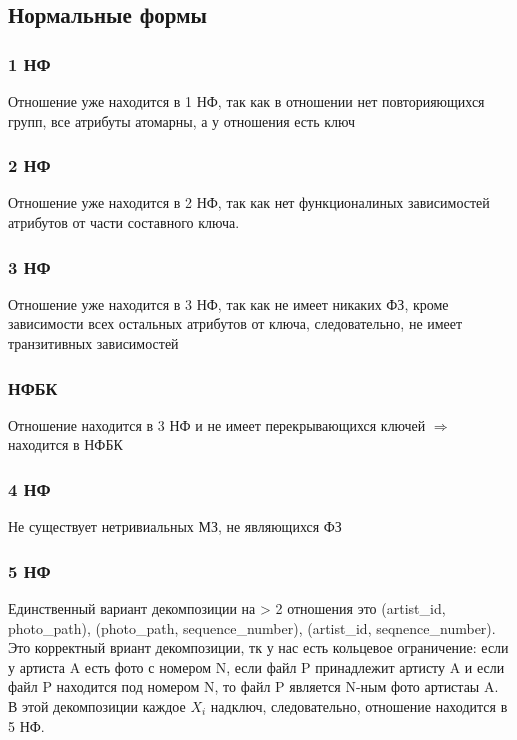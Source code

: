 \documentclass{article}
\begin{document}
\subsection{Нормальные формы}

\subsubsection{1 НФ}

Отношение уже находится в 1 НФ, так как в отношении нет повторияющихся групп, все атрибуты атомарны, а у отношения есть ключ

\subsubsection{2 НФ}

Отношение уже находится в 2 НФ, так как нет функционалиных зависимостей атрибутов от части составного ключа.

\subsubsection{3 НФ}

Отношение уже находится в 3 НФ, так как не имеет никаких ФЗ, кроме зависимости всех остальных атрибутов от ключа, следовательно, не имеет транзитивных зависимостей

\subsubsection{НФБК}

Отношение находится в 3 НФ и не имеет перекрывающихся ключей $\Rightarrow$ находится в НФБК

\subsubsection{4 НФ}

Не существует нетривиальных МЗ, не являющихся ФЗ

\subsubsection{5 НФ}
Единственный вариант декомпозиции на > 2 отношения это (artist\_id, photo\_path), (photo\_path, sequence\_number), (artist\_id, seqnence\_number). Это корректный вриант декомпозиции, тк у нас есть кольцевое ограничение: если у артиста A есть фото с номером N, если файл P принадлежит артисту A и если файл P находится под номером N, то файл P является N-ным фото артистаы A. В этой декомпозиции каждое $X_i$ надключ, следовательно, отношение находится в 5 НФ.
\end{document}
